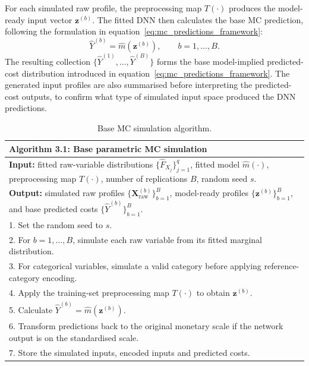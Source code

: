 For each simulated raw profile, the preprocessing map $T(\cdot)$ produces
the model-ready input vector $\mathbf{z}^{(b)}$.  The fitted DNN then
calculates the base MC prediction, following the formulation in
equation~\eqref{eq:mc_predictions_framework}:
\begin{equation}
    \widehat{Y}^{(b)}
    =
    \widehat{m}
    \left(
        \mathbf{z}^{(b)}
    \right),
    \qquad
    b=1,\ldots,B.
    \label{eq:base_mc_prediction_ch3}
\end{equation}
The resulting collection
$\{\widehat{Y}^{(1)},\ldots,\widehat{Y}^{(B)}\}$
forms the base model-implied predicted-cost distribution introduced in
equation~\eqref{eq:mc_predictions_framework}.  The generated input profiles are also summarised
before interpreting the predicted-cost outputs, to confirm what type of
simulated input space produced the DNN predictions.

\begin{table}[H]
\centering
\small
\renewcommand{\arraystretch}{1.15}
\begin{tabular}{p{}}
\toprule
\textbf{Algorithm 3.1: Base parametric MC simulation} \\
\midrule
\textbf{Input:} fitted raw-variable distributions
$\{\widehat{F}_{X_j}\}_{j=1}^{q}$, fitted model
$\widehat{m}(\cdot)$, preprocessing map $T(\cdot)$, number of
replications $B$, random seed $s$. \\[3pt]

\textbf{Output:} simulated raw profiles
$\{\mathbf{X}_{\mathrm{raw}}^{(b)}\}_{b=1}^{B}$, model-ready profiles
$\{\mathbf{z}^{(b)}\}_{b=1}^{B}$, and base predicted costs
$\{\widehat{Y}^{(b)}\}_{b=1}^{B}$. \\[3pt]

1. Set the random seed to $s$. \\
2. For $b=1,\ldots,B$, simulate each raw variable from its fitted marginal distribution. \\
3. For categorical variables, simulate a valid category before applying reference-category encoding. \\
4. Apply the training-set preprocessing map $T(\cdot)$ to obtain $\mathbf{z}^{(b)}$. \\
5. Calculate $\widehat{Y}^{(b)} = \widehat{m}(\mathbf{z}^{(b)})$. \\
6. Transform predictions back to the original monetary scale if the network output is on the standardised scale. \\
7. Store the simulated inputs, encoded inputs and predicted costs. \\
\bottomrule
\end{tabular}
\caption{Base MC simulation algorithm.}
\label{tab:base_mc_algorithm_ch3}
\end{table}

